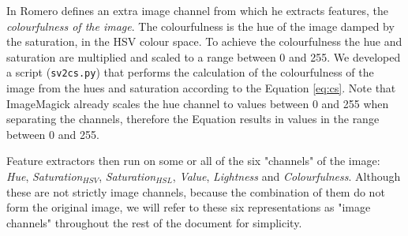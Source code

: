 \documentclass[11pt,a4paper,draft]{report}
\begin{document}
\begin{multicols}{2}
In \cite{rmc12ajs} Romero defines an extra image channel from which he extracts
features, the \emph{colourfulness of the image}.  The colourfulness is the hue
of the image damped by the saturation, in the HSV colour space.  To achieve the
colourfulness the hue and saturation are multiplied and scaled to a range
between 0 and 255.  We developed a script (\texttt{sv2cs.py}) that performs the
calculation of the colourfulness of the image from the hues and saturation
according to the Equation \ref{eq:cs}.  Note that ImageMagick already scales
the hue channel to values between 0 and 255 when separating the channels,
therefore the Equation results in values in the range between 0 and 255.

Feature extractors then run on some or all of the six "channels" of the image:
\emph{Hue}, \emph{Saturation$_{HSV}$}, \emph{Saturation$_{HSL}$}, \emph{Value},
\emph{Lightness} and \emph{Colourfulness}.  Although these are not strictly
image channels, because the combination of them do not form the original image,
we will refer to these six representations as "image channels" throughout the
rest of the document for simplicity.


\end{multicols}
\end{document}
